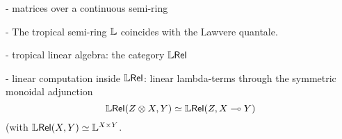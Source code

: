 


- matrices over a continuous semi-ring



- The tropical semi-ring $\mathbb{L}$ coincides with the Lawvere quantale. 


- tropical linear algebra: the category $\mathbb{L}\mathsf{Rel}$



- linear computation inside $\mathbb{L}\mathsf{Rel}$: linear lambda-terms through the symmetric monoidal adjunction 
$$
\mathbb{L}\mathsf{Rel}(Z\otimes X, Y) \simeq \mathbb{L}\mathsf{Rel} (Z, X\multimap Y)
$$
(with $\mathbb{L}\mathsf{Rel}(X,Y)\simeq \mathbb{L}^{X\times Y}$.




